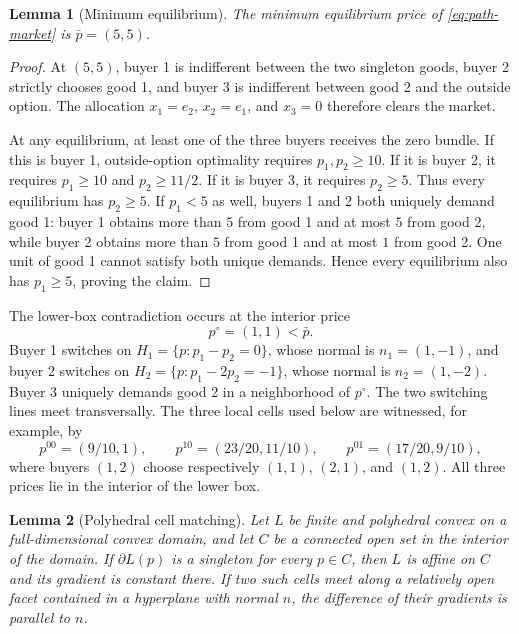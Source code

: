 \documentclass[11pt,a4paper,fleqn]{article}
\theoremstyle{plain}
\newtheorem{lemma}{Lemma}[section]
\theoremstyle{definition}
\begin{document}
\begin{lemma}[Minimum equilibrium]\label{lem:path-minimum-equilibrium}
The minimum equilibrium price of \eqref{eq:path-market} is $\bar p=(5,5)$.
\end{lemma}

\begin{proof}
At $(5,5)$, buyer 1 is indifferent between the two singleton goods, buyer 2 strictly chooses good 1, and buyer 3 is indifferent between good 2 and the outside option. The allocation $x_1=e_2$, $x_2=e_1$, and $x_3=0$ therefore clears the market.

At any equilibrium, at least one of the three buyers receives the zero bundle. If this is buyer 1, outside-option optimality requires $p_1,p_2\ge10$. If it is buyer 2, it requires $p_1\ge10$ and $p_2\ge11/2$. If it is buyer 3, it requires $p_2\ge5$. Thus every equilibrium has $p_2\ge5$. If $p_1<5$ as well, buyers 1 and 2 both uniquely demand good 1: buyer 1 obtains more than $5$ from good 1 and at most $5$ from good 2, while buyer 2 obtains more than $5$ from good 1 and at most $1$ from good 2. One unit of good 1 cannot satisfy both unique demands. Hence every equilibrium also has $p_1\ge5$, proving the claim.
\end{proof}

The lower-box contradiction occurs at the interior price
\[
p^\circ=(1,1)<\bar p.
\]
Buyer 1 switches on $H_1=\{p:p_1-p_2=0\}$, whose normal is $n_1=(1,-1)$, and buyer 2 switches on $H_2=\{p:p_1-2p_2=-1\}$, whose normal is $n_2=(1,-2)$. Buyer 3 uniquely demands good 2 in a neighborhood of $p^\circ$. The two switching lines meet transversally. The three local cells used below are witnessed, for example, by
\[
p^{00}=(9/10,1),\qquad
p^{10}=(23/20,11/10),\qquad
p^{01}=(17/20,9/10),
\]
where buyers $(1,2)$ choose respectively $(1,1)$, $(2,1)$, and $(1,2)$. All three prices lie in the interior of the lower box.

\begin{lemma}[Polyhedral cell matching]\label{lem:polyhedral-cell-matching}
Let $L$ be finite and polyhedral convex on a full-dimensional convex domain, and let $C$ be a connected open set in the interior of the domain. If $\partial L(p)$ is a singleton for every $p\in C$, then $L$ is affine on $C$ and its gradient is constant there. If two such cells meet along a relatively open facet contained in a hyperplane with normal $n$, the difference of their gradients is parallel to $n$.
\end{lemma}
\end{document}
